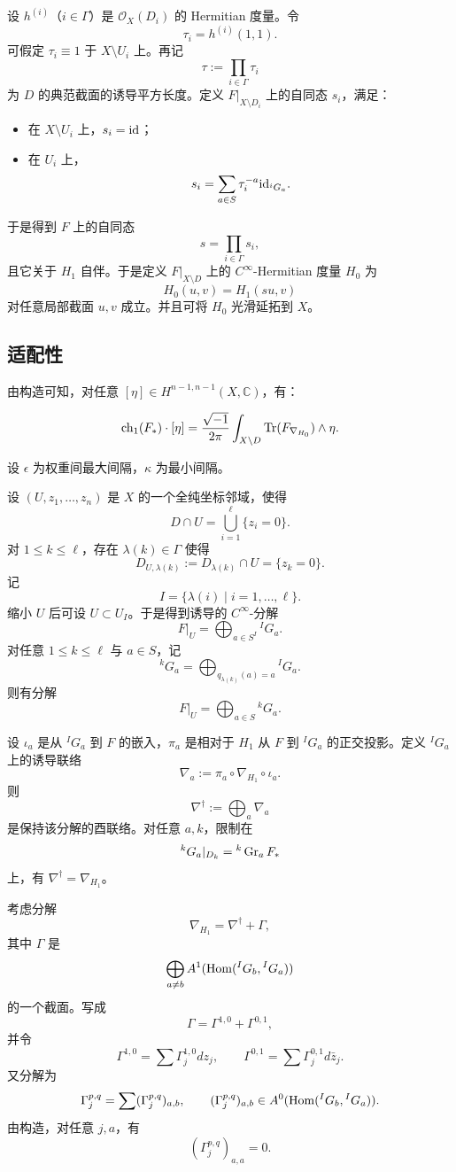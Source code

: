 设 \(h^{(i)}\)（\(i\in\Gamma\)）是 \( \mathcal O_X(D_i)\) 的 Hermitian 度量。令
\[
\tau_i=h^{(i)}(1,1).
\]
可假定 \(\tau_i\equiv 1\) 于 \(X\setminus U_i\) 上。再记
\[
\tau:=\prod_{i\in\Gamma}\tau_i
\]
为 \(D\) 的典范截面的诱导平方长度。定义 \(F|_{X\setminus D_i}\) 上的自同态 \(s_i\)，满足：
\begin{itemize}
\item 在 \(X\setminus U_i\) 上，\(s_i=\mathrm{id}\)；
\item 在 \(U_i\) 上，
\[
s_i=\sum_{a\in S}\tau_i^{-a}\mathrm{id}_{{}^iG_a}.
\]
\end{itemize}
于是得到 \(F\) 上的自同态
\[
s=\prod_{i\in\Gamma} s_i,
\]
且它关于 \(H_1\) 自伴。于是定义 \(F|_{X\setminus D}\) 上的 \(C^\infty\)-Hermitian 度量 \(H_0\) 为
\[
H_0(u,v)=H_1(su,v)
\]
对任意局部截面 \(u,v\) 成立。并且可将 \(H_0\) 光滑延拓到 \(X\)。

\subsection{适配性}

由构造可知，对任意 \([\eta]\in H^{n-1,n-1}(X,\mathbb C)\)，有：

\begin{proposition}
\[
\operatorname{ch}_1(F_*)\cdot [\eta]
=
\frac{\sqrt{-1}}{2\pi}
\int_{X\setminus D}\operatorname{Tr}(F_{\nabla_{H_0}})\wedge \eta.
\]
\end{proposition}

设 \(\epsilon\) 为权重间最大间隔，\(\kappa\) 为最小间隔。

设 \((U,z_1,\dots,z_n)\) 是 \(X\) 的一个全纯坐标邻域，使得
\[
D\cap U=\bigcup_{i=1}^\ell \{z_i=0\}.
\]
对 \(1\le k\le \ell\)，存在 \(\lambda(k)\in \Gamma\) 使得
\[
D_{U,\lambda(k)}:=D_{\lambda(k)}\cap U=\{z_k=0\}.
\]
记
\[
I=\{\lambda(i)\mid i=1,\dots,\ell\}.
\]
缩小 \(U\) 后可设 \(U\subset U_I\)。于是得到诱导的 \(C^\infty\)-分解
\[
F|_U=\bigoplus_{a\in S^I} {}^IG_a.
\]
对任意 \(1\le k\le \ell\) 与 \(a\in S\)，记
\[
{}^kG_a=\bigoplus_{q_{\lambda(k)}(a)=a} {}^IG_a.
\]
则有分解
\[
F|_U=\bigoplus_{a\in S} {}^kG_a. \tag{4}
\]

设 \(\iota_a\) 是从 \({}^IG_a\) 到 \(F\) 的嵌入，\(\pi_a\) 是相对于 \(H_1\) 从 \(F\) 到 \({}^IG_a\) 的正交投影。定义 \({}^IG_a\) 上的诱导联络
\[
\nabla_a:=\pi_a\circ \nabla_{H_1}\circ \iota_a.
\]
则
\[
\nabla^\dagger:=\bigoplus_a \nabla_a
\]
是保持该分解的酉联络。对任意 \(a,k\)，限制在
\[
{}^kG_a|_{D_k}={}^k\operatorname{Gr}_a F_*
\]
上，有 \(\nabla^\dagger=\nabla_{H_1}\)。

考虑分解
\[
\nabla_{H_1}=\nabla^\dagger+\Gamma,
\]
其中 \(\Gamma\) 是
\[
\bigoplus_{a\ne b} A^1(\operatorname{Hom}({}^IG_b,{}^IG_a))
\]
的一个截面。写成
\[
\Gamma=\Gamma^{1,0}+\Gamma^{0,1},
\]
并令
\[
\Gamma^{1,0}=\sum \Gamma_j^{1,0}dz_j,\qquad
\Gamma^{0,1}=\sum \Gamma_j^{0,1}d\bar z_j.
\]
又分解为
\[
\Gamma_j^{p,q}=\sum (\Gamma_j^{p,q})_{a,b},
\qquad
(\Gamma_j^{p,q})_{a,b}\in A^0(\operatorname{Hom}({}^IG_b,{}^IG_a)).
\]
由构造，对任意 \(j,a\)，有
\[
(\Gamma_j^{p,q})_{a,a}=0.
\]

